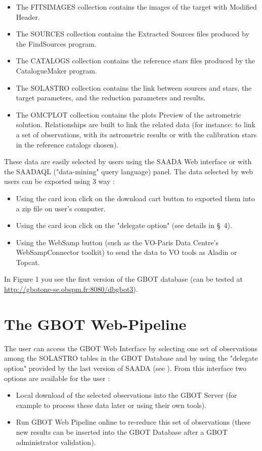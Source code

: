\begin{itemize}
\item The FITSIMAGES collection contains the images of the target with Modified Header.
\item The SOURCES collection contains the Extracted Sources files produced by the FindSources program.
\item The CATALOGS collection contains the reference stars files produced by the CatalogueMaker program.
\item The SOLASTRO collection contains the link between sources and stars, the target parameters, and the reduction parameters and results.
\item The OMCPLOT collection contains the plots Preview of the astrometric solution. Relationships are built to link the related data (for instance: to link a set of observations, with its astrometric results or with the calibration stars in the reference catalogs chosen).
\end{itemize}

These data are easily selected by users using the SAADA Web interface  or with the SAADAQL ("data-mining" query language) panel. The data selected by web users can be exported using 3 way :
\begin{itemize}
\item Using the card icon click on the download cart button to exported them into a zip file on user's computer.
\item Using the card icon click on the "delegate option" (see details in \S~4).
\item Using the WebSamp button (such as the VO-Paris Data Centre's WebSampConnector toolkit) to send the data to VO tools as Aladin or Topcat.
\end{itemize}
In Figure 1 you see the  first version of the GBOT database (can be tested at \url{http://gbotone-se.obspm.fr:8080/dbgbot3}).

\section{The GBOT Web-Pipeline}
The user can access the GBOT Web Interface by selecting one set of observations among the SOLASTRO tables in the GBOT Database and by using the "delegate option" provided by the last version of SAADA (see \citet{michel12}). From this interface two options are available for the user :
\begin{itemize}
\item Local download of the selected observations into the GBOT Server
(for example to process these data later or using their own tools).
\item Run GBOT Web Pipeline online to re-reduce this set of observations
(these new results can be inserted into the GBOT Database after a GBOT administrator validation).
\end{itemize}

